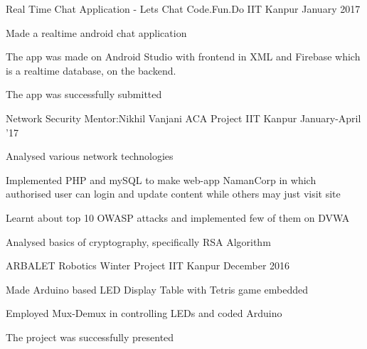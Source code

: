 \begin{cventries}
  \cventry
    {Real Time Chat Application - Lets Chat}
    {Code.Fun.Do}
    {IIT Kanpur}
    {January 2017}
    {
      \begin{cvitems}
        \item {Made a realtime android chat application}
        \item {The app was made on Android Studio with frontend in XML and Firebase which is a realtime database, on the backend.}
        \item {The app was successfully submitted}
      \end{cvitems}
    }
    \cventry
    {Network Security\hspace{10pt} Mentor:Nikhil Vanjani}
    {ACA Project}
    {IIT Kanpur}
    {January-April '17}
    {
      \begin{cvitems}
        \item {Analysed various network technologies}
        \item {Implemented PHP and mySQL to make web-app NamanCorp in which authorised user can login and update content while others may just visit site}
        \item{Learnt about top 10 OWASP attacks and implemented few of them on DVWA}
        \item{Analysed basics of cryptography, specifically RSA Algorithm}
      \end{cvitems}
    }
    \cventry
    {ARBALET}
    {Robotics Winter Project}
    {IIT Kanpur}
    {December 2016}
    {
      \begin{cvitems}
        \item {Made Arduino based LED Display Table with Tetris game embedded}
        \item {Employed Mux-Demux in controlling LEDs and coded Arduino}
        \item {The project was successfully presented}
      \end{cvitems}
    }
    
  
\end{cventries}
